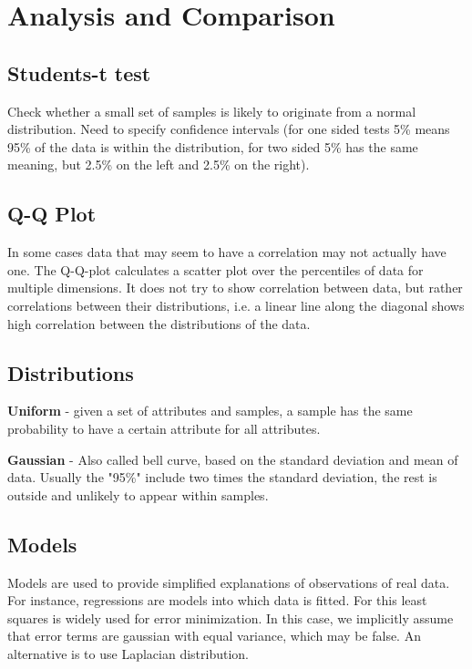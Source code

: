 \section{Analysis and Comparison}

\subsection{Students-t test}

Check whether a small set of samples is likely to originate from a normal distribution. Need to specify confidence intervals (for one sided tests 5\% means 95\% of the data is within the distribution, for two sided 5\% has the same meaning, but 2.5\% on the left and 2.5\% on the right).

\subsection{Q-Q Plot}

In some cases data that may seem to have a correlation may not actually have one. The Q-Q-plot calculates a scatter plot over the percentiles of data for multiple dimensions. It does not try to show correlation between data, but rather correlations between their distributions, i.e. a linear line along the diagonal shows high correlation between the distributions of the data.

\subsection{Distributions}

\textbf{Uniform} - given a set of attributes and samples, a sample has the same probability to have a certain attribute for all attributes.

\textbf{Gaussian} - Also called bell curve, based on the standard deviation and mean of data. Usually the "95\%" include two times the standard deviation, the rest is outside and unlikely to appear within samples.

\subsection{Models}

Models are used to provide simplified explanations of observations of real data. For instance, regressions are models into which data is fitted. For this least squares is widely used for error minimization. In this case, we implicitly assume that error terms are gaussian with equal variance, which may be false. An alternative is to use Laplacian distribution.


